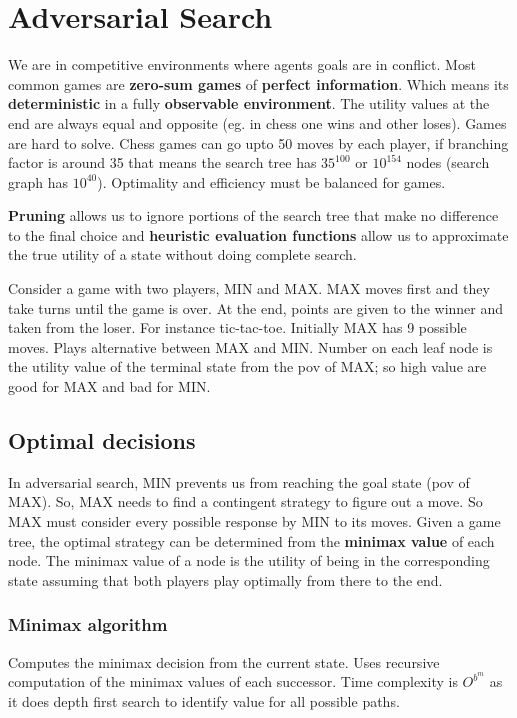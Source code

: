 \chapter{Adversarial Search}

We are in competitive environments where agents goals are in conflict. Most common games are \textbf{zero-sum games}  of \textbf{perfect information}. Which means its \textbf{deterministic} in a fully \textbf{observable environment}. The utility values at the end are always equal and opposite (eg. in chess one wins and other loses). Games are hard to solve. Chess games can go upto 50 moves by each player, if branching factor is around 35 that means the search tree has $35^{100}$ or $10^{154}$ nodes (search graph has $10^{40}$). Optimality and efficiency must be balanced for games.

\vspace{1em}
\textbf{Pruning}  allows us to ignore portions of the search tree that make no difference to the final choice and \textbf{heuristic evaluation functions} allow us to approximate the true utility of a state without doing complete search.

\vspace{1em}
Consider a game with two players, MIN and MAX. MAX moves first and they take turns until the game is over. At the end, points are given to the winner and taken from the loser. For instance tic-tac-toe. Initially MAX has 9 possible moves. Plays alternative between MAX and MIN. Number on each leaf node is the utility value of the terminal state from the pov of MAX; so high value are good for MAX and bad for MIN.


\section{Optimal decisions}
In adversarial search, MIN prevents us from reaching the goal state (pov of MAX). So, MAX needs to find a contingent strategy to figure out a move. So MAX must consider every possible response by MIN to its moves.
\vspace{1em}
Given a game tree, the optimal strategy can be determined from the \textbf{minimax value}  of each node. The minimax value of a node is the utility of being in the corresponding state assuming that both players play optimally from there to the end. 

\subsection{Minimax algorithm}
Computes the minimax decision from the current state. Uses recursive computation of the minimax values of each successor. Time complexity is $O^{b^{m}}$ as it does depth first search to identify value for all possible paths.

